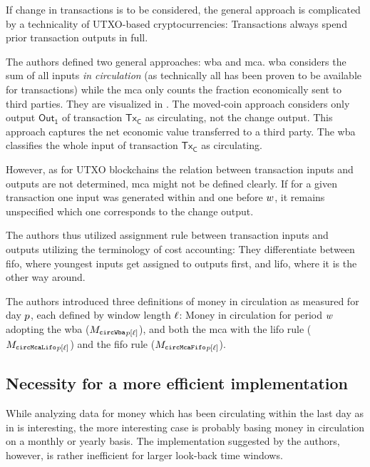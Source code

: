 If change in transactions is to be considered, the general approach is complicated by a technicality of UTXO-based cryptocurrencies: Transactions always spend prior transaction outputs in full. %

The authors defined two general approaches: \ac{wba} and \ac{mca}.  %
\ac{wba} considers the sum of all inputs \textit{in circulation} (as technically all has been proven to be available for transactions) while the \ac{mca} only counts the fraction economically sent to third parties.  %
%
They are visualized in .  %
The moved-coin approach considers only output $\mathsf{Out_1}$ of transaction $\mathsf{Tx_C}$ as circulating, not the change output.  %
This approach captures the net economic value transferred to a third party.  %
The \ac{wba} classifies the whole input of transaction $\mathsf{Tx_C}$ as circulating.  %

However, as for UTXO blockchains the relation between transaction inputs and outputs are not determined, \ac{mca} might not be defined clearly. %
If for a given transaction one input was generated within and one before ${w}$, it remains unspecified which one corresponds to the change output.  %

The authors thus utilized assignment rule between transaction inputs and outputs utilizing the terminology of cost accounting: %
They differentiate between \ac{fifo}, where youngest inputs get assigned to outputs first, and \ac{lifo}, where it is the other way around.  %

The authors introduced three definitions of money in circulation as measured for day \({p}\), each defined by window length ${\ell}$: %
Money in circulation for period ${w}$ adopting the \ac{wba} ($ {{M_{\mathtt{circWba}}}_{{p}[{\ell}]}} $), and both the \ac{mca} with the \ac{lifo} rule ($ {{M_{\mathtt{circMcaLifo}}}_{{p}[{\ell}]}} $) and the \ac{fifo} rule ($ {{M_{\mathtt{circMcaFifo}}}_{{p}[{\ell}]}} $).

\subsection{Necessity for a more efficient implementation}
\label{sec:necessity_effi}%
While analyzing data for money which has been circulating within the last day as in \cite{pernice2019cryptocurrencies} is interesting, the more interesting case is probably basing money in circulation on a monthly or yearly basis. %
The implementation suggested by the authors, however, is rather inefficient for larger look-back time windows. %

